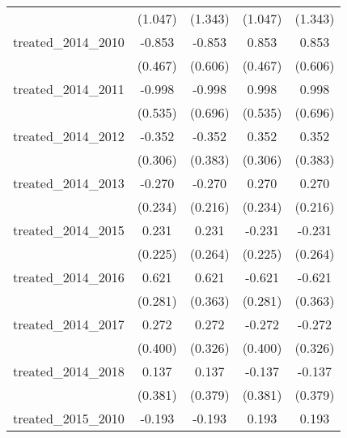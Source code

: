 {\begin{tabular}{l*{4}{c}}
            &     (1.047)         &     (1.343)         &     (1.047)         &     (1.343)         \\
[1em]
treated\_2014\_2010&      -0.853         &      -0.853         &       0.853         &       0.853         \\
            &     (0.467)         &     (0.606)         &     (0.467)         &     (0.606)         \\
[1em]
treated\_2014\_2011&      -0.998         &      -0.998         &       0.998         &       0.998         \\
            &     (0.535)         &     (0.696)         &     (0.535)         &     (0.696)         \\
[1em]
treated\_2014\_2012&      -0.352         &      -0.352         &       0.352         &       0.352         \\
            &     (0.306)         &     (0.383)         &     (0.306)         &     (0.383)         \\
[1em]
treated\_2014\_2013&      -0.270         &      -0.270         &       0.270         &       0.270         \\
            &     (0.234)         &     (0.216)         &     (0.234)         &     (0.216)         \\
[1em]
treated\_2014\_2015&       0.231         &       0.231         &      -0.231         &      -0.231         \\
            &     (0.225)         &     (0.264)         &     (0.225)         &     (0.264)         \\
[1em]
treated\_2014\_2016&       0.621\sym{*}  &       0.621         &      -0.621\sym{*}  &      -0.621         \\
            &     (0.281)         &     (0.363)         &     (0.281)         &     (0.363)         \\
[1em]
treated\_2014\_2017&       0.272         &       0.272         &      -0.272         &      -0.272         \\
            &     (0.400)         &     (0.326)         &     (0.400)         &     (0.326)         \\
[1em]
treated\_2014\_2018&       0.137         &       0.137         &      -0.137         &      -0.137         \\
            &     (0.381)         &     (0.379)         &     (0.381)         &     (0.379)         \\
[1em]
treated\_2015\_2010&      -0.193         &      -0.193         &       0.193         &       0.193         \\

\end{tabular}}
